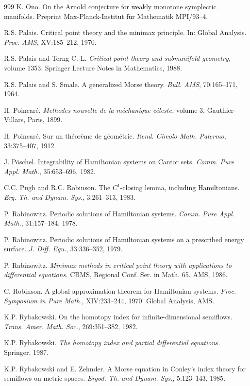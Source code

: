 \begin{thebibliography}{999}
 K. Ono. On the Arnold conjecture for weakly monotone
symplectic manifolds. Preprint Max-Planck-Institut für Mathematik
MPI/93--4.

 R.S. Palais. Critical point theory and the minimax
principle. In: Global Analysis. \emph{Proc. AMS}, XV:185--212, 1970.

 R.S. Palais and Terng C.-L. \emph{Critical point theory and
submanifold geometry,} volume 1353. Springer Lecture Notes in
Mathematics, 1988.

 R.S. Palais and S. Smale. A generalized Morse theory.
\emph{Bull. AMS}, 70:165--171, 1964.

 H. Poincaré. \emph{Methodes nouvelle de la méchanique
céleste,} volume 3. Gauthier-Villars, Paris, 1899.

 H. Poincaré. Sur un théorème de géométrie.
\emph{Rend. Circolo Math. Palermo}, 33:375--407, 1912.

 J. Pöschel. Integrability of Hamiltonian systems on
Cantor sets. \emph{Comm. Pure Appl. Math.}, 35:653--696, 1982.

 C.C. Pugh and R.C. Robinson. The $C^1$-closing lemma,
including Hamiltonians. \emph{Erg. Th. and Dynam. Sys.}, 3:261--313, 1983.

 P. Rabinowitz. Periodic solutions of Hamiltonian systems.
\emph{Comm. Pure Appl. Math.}, 31:157--184, 1978.

 P. Rabinowitz. Periodic solutions of Hamiltonian systems
on a prescribed energy surface. \emph{J. Diff. Equ.}, 33:336--352, 1979.

 P. Rabinowitz. \emph{Minimax methods in critical point
theory with applications to differential equations.} CBMS, Regional
Conf. Ser. in Math. 65. AMS, 1986.

 C. Robinson. A global approximation theorem for
Hamiltonian systems. \emph{Proc. Symposium in Pure Math.}, XIV:233--244,
1970. Global Analysis, AMS.

 K.P. Rybakowski. On the homotopy index for
infinite-dimensional semiflows. \emph{Trans. Amer. Math. Soc.},
269:351--382, 1982.

 K.P. Rybakowski. \emph{The homotopy index and partial
differential equations.} Springer, 1987.

 K.P. Rybakowski and E. Zehnder. A Morse equation in
Conley's index theory for semiflows on metric spaces. \emph{Ergod. Th.
and Dynam. Sys.}, 5:123--143, 1985.


\end{thebibliography}

